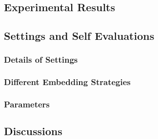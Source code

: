 \subsection{Experimental Results}

\subsection{Settings and Self Evaluations}

\subsubsection{Details of Settings}

\subsubsection{Different Embedding Strategies}

\subsubsection{Parameters}

\subsection{Discussions}
